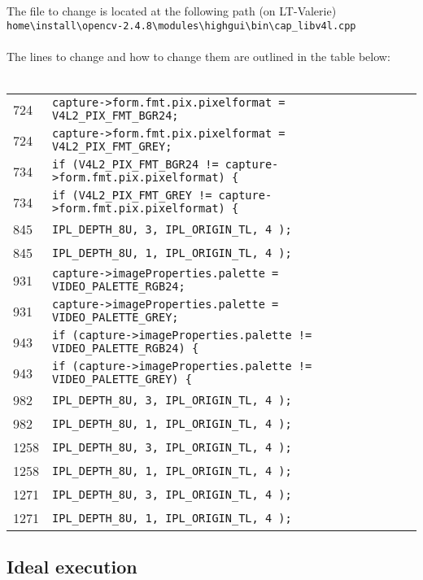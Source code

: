 \documentclass[fullpage]{report}
\begin{document}
The file to change is located at the following path (on LT-Valerie)\\
\verb|home\install\opencv-2.4.8\modules\highgui\bin\cap_libv4l.cpp| \\
\\
The lines to change and how to change them are outlined in the table below: \\
\\
\begin{tabular}{l | l | l}
\hline
724 & \verb|capture->form.fmt.pix.pixelformat = V4L2_PIX_FMT_BGR24;| \\
724 & \verb|capture->form.fmt.pix.pixelformat = V4L2_PIX_FMT_GREY;| \\ \hline
734 & \verb|if (V4L2_PIX_FMT_BGR24 != capture->form.fmt.pix.pixelformat) {|\\
734 & \verb|if (V4L2_PIX_FMT_GREY != capture->form.fmt.pix.pixelformat) {|\\ \hline
845 & \verb|IPL_DEPTH_8U, 3, IPL_ORIGIN_TL, 4 );|\\
845 & \verb|IPL_DEPTH_8U, 1, IPL_ORIGIN_TL, 4 );|\\ \hline
931 & \verb|capture->imageProperties.palette = VIDEO_PALETTE_RGB24;| \\
931 & \verb|capture->imageProperties.palette = VIDEO_PALETTE_GREY;| \\ \hline
943 & \verb|if (capture->imageProperties.palette != VIDEO_PALETTE_RGB24) {| \\
943 & \verb|if (capture->imageProperties.palette != VIDEO_PALETTE_GREY) {| \\ \hline
982 & \verb|IPL_DEPTH_8U, 3, IPL_ORIGIN_TL, 4 );|\\
982 & \verb|IPL_DEPTH_8U, 1, IPL_ORIGIN_TL, 4 );|\\ \hline
1258 & \verb|IPL_DEPTH_8U, 3, IPL_ORIGIN_TL, 4 );|\\
1258 & \verb|IPL_DEPTH_8U, 1, IPL_ORIGIN_TL, 4 );|\\ \hline
1271 & \verb|IPL_DEPTH_8U, 3, IPL_ORIGIN_TL, 4 );|\\
1271 & \verb|IPL_DEPTH_8U, 1, IPL_ORIGIN_TL, 4 );|\\ \hline


\end{tabular}


\subsection{Ideal execution}
\end{document}
